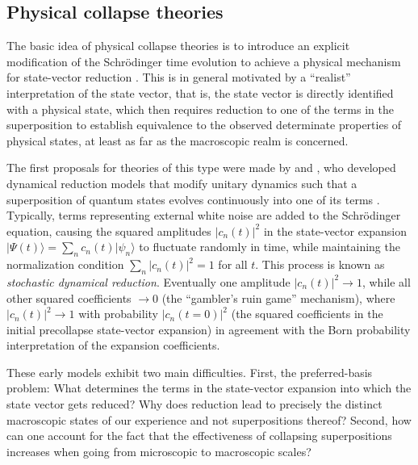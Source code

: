 \documentclass[rmp,aps,amsmath,amsfonts,noshowkeys,noshowpacs,12pt]{revtex4}
\newcommand{\ket}[1]{\ensuremath{|{#1\rangle}}}
\begin{document}
\subsection{Physical collapse theories}

The basic idea of physical collapse theories is to introduce an
explicit modification of the Schr\"odinger time evolution to achieve a
physical mechanism for state-vector reduction \citep[for an extensive
recent review, see][]{Bassi:2003:yb}. This is in general motivated by
a ``realist'' interpretation of the state vector, that is, the state
vector is directly identified with a physical state, which then
requires reduction to one of the terms in the superposition to
establish equivalence to the observed determinate properties of
physical states, at least as far as the macroscopic realm is
concerned.

The first proposals for theories of this type were made by
\citet{Pearle:1976:on,Pearle:1979:rq,Pearle:1982:rv} and
\citet{Gisin:1984:qs}, who developed dynamical reduction models that
modify unitary dynamics such that a superposition of quantum states
evolves continuously into one of its terms \citep[see also the review
by][]{Pearle:1999:cr}. Typically, terms representing external white
noise are added to the Schr\"odinger equation, causing the squared
amplitudes $|c_n(t)|^2$ in the state-vector expansion
$\ket{\Psi(t)}=\sum_n c_n(t) \ket{\psi_n}$ to fluctuate randomly in
time, while maintaining the normalization condition $\sum_n
|c_n(t)|^2=1$ for all $t$. This process is known as {\em stochastic
  dynamical reduction}.  Eventually one amplitude $|c_n(t)|^2
\rightarrow 1$, while all other squared coefficients $\rightarrow 0$
(the ``gambler's ruin game'' mechanism), where $|c_n(t)|^2 \rightarrow
1$ with probability $|c_n(t=0)|^2$ (the squared coefficients in the
initial precollapse state-vector expansion) in agreement with the Born
probability interpretation of the expansion coefficients.
   
These early models exhibit two main difficulties.  First, the
preferred-basis problem: What determines the terms in the state-vector
expansion into which the state vector gets reduced? Why does reduction
lead to precisely the distinct macroscopic states of our experience
and not superpositions thereof? Second, how can one account for the
fact that the effectiveness of collapsing superpositions increases
when going from microscopic to macroscopic scales?
\end{document}
